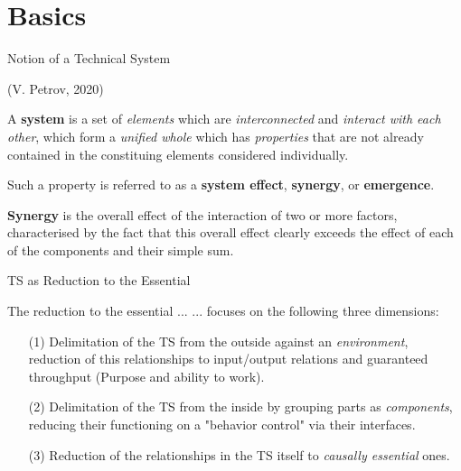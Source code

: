 \documentclass{beamer}
\title{Modelling Sustainable Systems\\ and Semantic Web\\[6pt]
  Modelling Contradictory Requirements in TRIZ
  \vskip1em}
\subtitle{Lecture in the Module 10-202-2309\\ for Master Computer Science}
\author{Prof. Dr. Hans-Gert Gräbe\\
\url{http://www.informatik.uni-leipzig.de/~graebe}}
\date{April 2021}
\begin{document}
{
\begin{frame}
  \titlepage
\end{frame}}

\section{Basics}
\begin{frame}{Notion of a Technical System}

(V. Petrov, 2020) 

A \textbf{system} is a set of \emph{elements} which are \emph{interconnected}
and \emph{interact with each other}, which form a \emph{unified whole} which
has \emph{properties} that are not already contained in the constituing
elements considered individually.  

Such a property is referred to as a \textbf{system effect}, \textbf{synergy},
or \textbf{emergence}.

\textbf{Synergy} is the overall effect of the interaction of two or more
factors, characterised by the fact that this overall effect clearly exceeds
the effect of each of the components and their simple sum.
\end{frame}

\begin{frame}{TS as Reduction to the Essential}
  \begin{block}{The reduction to the essential ... }
    ... focuses on the following three dimensions:
    \begin{itemize}
    \item[(1)] Delimitation of the TS from the outside against an
      \emph{environment}, reduction of this relationships to input/output
      relations and guaranteed throughput (Purpose and ability to work).
    \item[(2)] Delimitation of the TS from the inside by grouping parts as
      \emph{components}, reducing their functioning on a "behavior control"
      via their interfaces.
    \item[(3)] Reduction of the relationships in the TS itself to
      \emph{causally essential} ones.
    \end{itemize}
  \end{block}
\end{frame}
\end{document}
